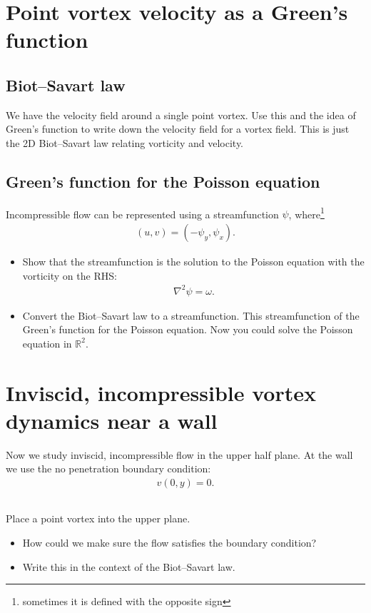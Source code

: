 \documentclass[11pt,letterpaper]{report}
\begin{document}
\section{Point vortex velocity as a Green's function}

\subsection{Biot–Savart law}
We have the velocity field around a single point vortex. Use this and the idea of Green's function to write down the velocity field for a vortex field. This is just the 2D Biot–Savart law relating vorticity and velocity.

\subsection{Green's function for the Poisson equation}
Incompressible flow can be represented using a streamfunction $\psi$, where\footnote{sometimes it is defined with the opposite sign}
\begin{align}
    (u,v) = (-\psi_y,\psi_x). 
\end{align}

\begin{itemize}
    \item Show that the streamfunction is the solution to the Poisson equation with the vorticity on the RHS:
        \begin{align}
            \nabla^2\psi = \omega.
        \end{align}
    \item Convert the Biot–Savart law to a streamfunction. This streamfunction of the Green's function for the Poisson equation. Now you could solve the Poisson equation in $\mathbb{R}^2$.
\end{itemize}

\section{Inviscid, incompressible vortex dynamics near a wall}
Now we study inviscid, incompressible flow in the upper half plane. At the wall we use the no penetration boundary condition:
\begin{align}
    v(0,y) = 0.
\end{align}

\subsection{}
Place a point vortex into the upper plane. 
\begin{itemize}
    \item How could we make sure the flow satisfies the boundary condition?
    \item Write this in the context of the Biot–Savart law.
\end{itemize}
\end{document}
